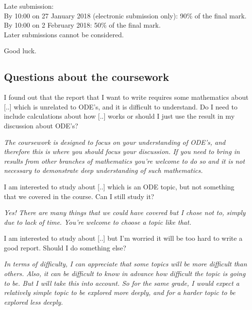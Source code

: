 Late submission:\\
By 10:00 on 27 January 2018 (electronic submission only): 90\% of the final mark.\\
By 10:00 on 2 February 2018: 50\% of the final mark.\\
Later submissions cannot be considered.

Good luck.

\subsection{Questions about the coursework}

I found out that the report that I want to write requires some mathematics about [..] which is unrelated to ODE's, and it is difficult to understand. Do I need to include calculations about how [..] works or should I just use the result in my discussion about ODE's?

\emph{The coursework is designed to focus on your understanding of ODE's, and therefore this is where you should focus your discussion. If you need to bring in results from other branches of mathematics you're welcome to do so and it is not necessary to demonstrate deep understanding of such mathematics.}

I am interested to study about [..] which is an ODE topic, but not something that we covered in the course. Can I still study it?

\emph{Yes! There are many things that we could have covered but I chose not to, simply due to lack of time. You're welcome to choose a topic like that.}

I am interested to study about [..] but I'm worried it will be too hard to write a good report. Should I do something else?

\emph{In terms of difficulty, I can appreciate that some topics will be more difficult than others. Also, it can be difficult to know in advance how difficult the topic is going to be. But I will take this into account. So for the same grade, I would expect a relatively simple topic to be explored more deeply, and for a harder topic to be explored less deeply.}

